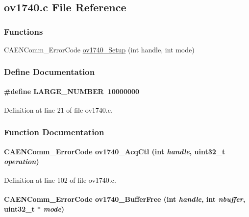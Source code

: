 \subsection{ov1740.c File Reference}
\label{ov1740_8c}
\subsubsection*{Functions}
\begin{DoxyCompactItemize}
\item 
CAENComm\_\-ErrorCode \hyperlink{ov1740_8c_a37458e8b4bbc712076b0b1e15c5241e9}{ov1740\_\-Setup} (int handle, int mode)
\end{DoxyCompactItemize}


\subsubsection{Define Documentation}
\paragraph[{LARGE\_\-NUMBER}]{\setlength{\rightskip}{0pt plus 5cm}\#define LARGE\_\-NUMBER~10000000}\hfill\label{ov1740_8c_a72e1d1d4b3243f4e7ec115f199298e34}


Definition at line 21 of file ov1740.c.

\subsubsection{Function Documentation}
\paragraph[{ov1740\_\-AcqCtl}]{\setlength{\rightskip}{0pt plus 5cm}CAENComm\_\-ErrorCode ov1740\_\-AcqCtl (int {\em handle}, \/  uint32\_\-t {\em operation})}\hfill\label{ov1740_8c_a9f50f40f2578ebea2eff57a82a172ac8}


Definition at line 102 of file ov1740.c.
\paragraph[{ov1740\_\-BufferFree}]{\setlength{\rightskip}{0pt plus 5cm}CAENComm\_\-ErrorCode ov1740\_\-BufferFree (int {\em handle}, \/  int {\em nbuffer}, \/  uint32\_\-t $\ast$ {\em mode})}\hfill\label{ov1740_8c_a82abc70f4cc7d36c226d4c041f152de3}


